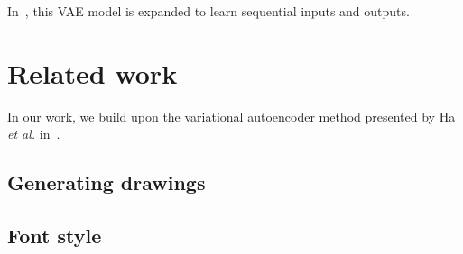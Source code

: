 In~\cite{graves2013generating}, this VAE model is expanded to learn sequential inputs and outputs. 

\section{Related work}
In our work, we build upon the variational autoencoder method presented by Ha \textit{et al.} in~\cite{ha2017neural}.

\subsection{Generating drawings}



\subsection{Font style}
